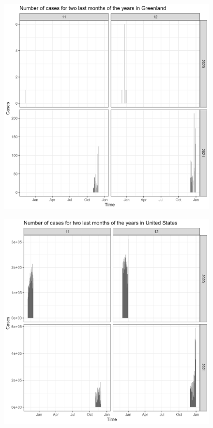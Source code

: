 \documentclass[a4paper]{article}
\theoremstyle{definition}
\begin{document}
\begin{enumerate}[i)]
\begin{enumerate}[1)]
\begin{figure}[H]
			\end{figure}
			\begin{figure}[H]
				\centering
				\includegraphics[scale=0.25]{images/6.4.2.png}
			\end{figure}
			\begin{figure}[H]
				\centering
				\includegraphics[scale=0.25]{images/6.4.3.png}

\end{figure}
\end{enumerate}
\end{enumerate}
\end{document}
